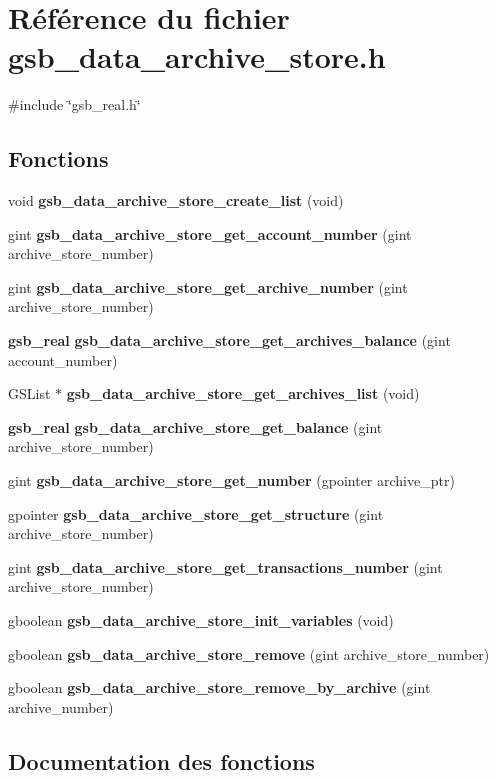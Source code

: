 \section{Référence du fichier gsb\_\-data\_\-archive\_\-store.h}
\label{gsb__data__archive__store_8h}
{\ttfamily \#include \char`\"{}gsb\_\-real.h\char`\"{}}\par
\subsection*{Fonctions}
\begin{DoxyCompactItemize}
\item 
void {\bf gsb\_\-data\_\-archive\_\-store\_\-create\_\-list} (void)
\item 
gint {\bf gsb\_\-data\_\-archive\_\-store\_\-get\_\-account\_\-number} (gint archive\_\-store\_\-number)
\item 
gint {\bf gsb\_\-data\_\-archive\_\-store\_\-get\_\-archive\_\-number} (gint archive\_\-store\_\-number)
\item 
{\bf gsb\_\-real} {\bf gsb\_\-data\_\-archive\_\-store\_\-get\_\-archives\_\-balance} (gint account\_\-number)
\item 
GSList $\ast$ {\bf gsb\_\-data\_\-archive\_\-store\_\-get\_\-archives\_\-list} (void)
\item 
{\bf gsb\_\-real} {\bf gsb\_\-data\_\-archive\_\-store\_\-get\_\-balance} (gint archive\_\-store\_\-number)
\item 
gint {\bf gsb\_\-data\_\-archive\_\-store\_\-get\_\-number} (gpointer archive\_\-ptr)
\item 
gpointer {\bf gsb\_\-data\_\-archive\_\-store\_\-get\_\-structure} (gint archive\_\-store\_\-number)
\item 
gint {\bf gsb\_\-data\_\-archive\_\-store\_\-get\_\-transactions\_\-number} (gint archive\_\-store\_\-number)
\item 
gboolean {\bf gsb\_\-data\_\-archive\_\-store\_\-init\_\-variables} (void)
\item 
gboolean {\bf gsb\_\-data\_\-archive\_\-store\_\-remove} (gint archive\_\-store\_\-number)
\item 
gboolean {\bf gsb\_\-data\_\-archive\_\-store\_\-remove\_\-by\_\-archive} (gint archive\_\-number)
\end{DoxyCompactItemize}


\subsection{Documentation des fonctions}
